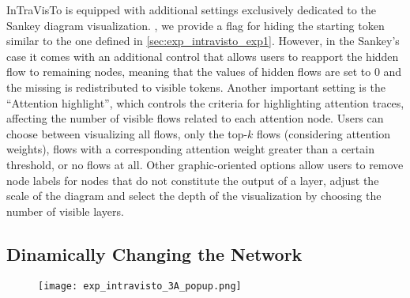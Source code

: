InTraVisTo is equipped with additional settings exclusively dedicated to the Sankey diagram visualization.
, we provide a flag for hiding the starting token similar to the one defined in \cref{sec:exp_intravisto_exp1}.
However, in the Sankey's case it comes with an additional control that allows users to reapport the hidden flow to remaining nodes, meaning that the values of hidden flows are set to $0$ and the missing  is redistributed to visible tokens.
Another important setting is the ``Attention highlight'', which controls the criteria for highlighting attention traces, affecting the number of visible flows related to each attention node.
Users can choose between visualizing all flows, only the top-$k$ flows (considering attention weights),  flows with a corresponding attention weight greater than a certain threshold, or no flows at all.
Other graphic-oriented options allow users to remove node labels for nodes that do not constitute the output of a layer, adjust the scale of the diagram and select the depth of the visualization by choosing the number of visible layers.

\subsection{Dinamically Changing the Network}\label{sec:exp_intravisto_exp3}

\begin{figure}[t!]
    \centering
    \texttt{[image: exp\_intravisto\_3A\_popup.png]}
    \caption{}
    \label{fig:exp_intravisto_3_A}
\end{figure}


